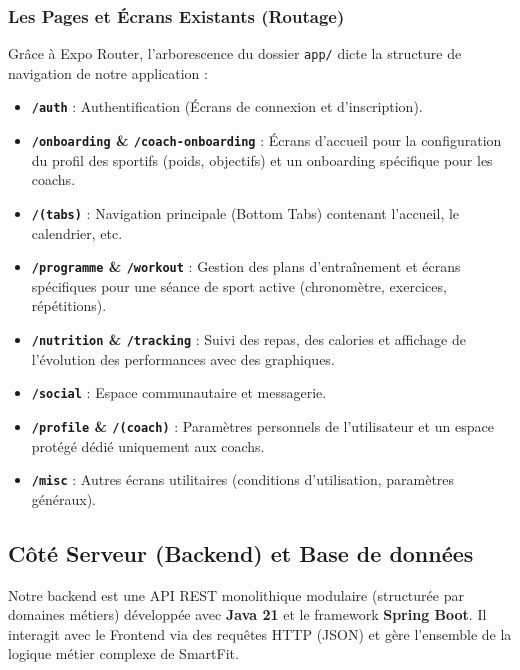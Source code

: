 \subsubsection{Les Pages et Écrans Existants (Routage)}
Grâce à Expo Router, l'arborescence du dossier \texttt{app/} dicte la structure de navigation de notre application :
\begin{itemize}
    \item \textbf{\texttt{/auth}} : Authentification (Écrans de connexion et d'inscription).
    \item \textbf{\texttt{/onboarding} \& \texttt{/coach-onboarding}} : Écrans d'accueil pour la configuration du profil des sportifs (poids, objectifs) et un onboarding spécifique pour les coachs.
    \item \textbf{\texttt{/(tabs)}} : Navigation principale (Bottom Tabs) contenant l'accueil, le calendrier, etc.
    \item \textbf{\texttt{/programme} \& \texttt{/workout}} : Gestion des plans d'entraînement et écrans spécifiques pour une séance de sport active (chronomètre, exercices, répétitions).
    \item \textbf{\texttt{/nutrition} \& \texttt{/tracking}} : Suivi des repas, des calories et affichage de l'évolution des performances avec des graphiques.
    \item \textbf{\texttt{/social}} : Espace communautaire et messagerie.
    \item \textbf{\texttt{/profile} \& \texttt{/(coach)}} : Paramètres personnels de l'utilisateur et un espace protégé dédié uniquement aux coachs.
    \item \textbf{\texttt{/misc}} : Autres écrans utilitaires (conditions d'utilisation, paramètres généraux).
\end{itemize}

\subsection{Côté Serveur (Backend) et Base de données}
Notre backend est une API REST monolithique modulaire (structurée par domaines métiers) développée avec \textbf{Java 21} et le framework \textbf{Spring Boot}. Il interagit avec le Frontend via des requêtes HTTP (JSON) et gère l'ensemble de la logique métier complexe de SmartFit.

